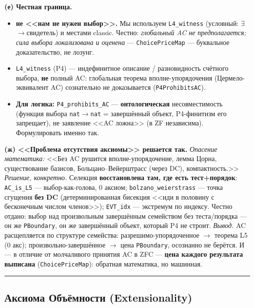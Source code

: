\documentclass[11pt,a4paper]{article}
\begin{document}
\textbf{(е) Честная граница.}
\begin{itemize}
\item \textbf{не <<нам не нужен выбор>>.} Мы используем \texttt{L4\_\allowbreak{}witness} (условный: $\exists$$\to$свидетель) и местами classic. Честно: \emph{глобальный AC не предполагается; сила выбора локализована и оценена} --- \texttt{Choice\allowbreak{}Price\allowbreak{}Map} --- буквальное доказательство, не лозунг.
\item \texttt{L4\_\allowbreak{}witness} (P4) --- индефинитное описание / разновидность счётного выбора, \textbf{не} полный AC: глобальная теорема вполне-упорядочения (Цермело-эквивалент AC) сознательно не доказывается (\texttt{P4Prohibits\allowbreak{}AC}).
\item \textbf{Для логика:} \texttt{P4\_\allowbreak{}prohibits\_\allowbreak{}AC} --- \textbf{онтологическая} несовместимость (функция выбора \texttt{nat$\to$nat} = завершённый объект, P4-финитизм его запрещает), не заявление <<AC ложна>> (в ZF независима). Формулировать именно так.
\end{itemize}

\textbf{(ж) <<Проблема отсутствия аксиомы>> решается так.} \emph{Опасение математика:} <<Без AC рушится вполне-упорядочение, лемма Цорна, существование базисов, Больцано--Вейерштрасс (через DC), компактность.>> \emph{Решение, конкретно.} Селекция \textbf{восстановлена там, где есть тест+порядок}: \texttt{AC\_\allowbreak{}is\_\allowbreak{}L5} --- выбор-как-голова, 0 аксиом; \texttt{bolzano\_\allowbreak{}weierstrass} --- точка сгущения \textbf{без DC} (детерминированная бисекция <<иди в половину с бесконечным числом членов>>); \texttt{EVT\_\allowbreak{}idx} --- экстремум по индексу. Честно отдано: выбор над произвольным завершённым семейством без теста/порядка --- он же \texttt{PBoundary}, он же завершённый объект, который P4 не строит. \emph{Вывод.} AC расщепляется по структуре семейства: разрешимо-упорядоченное $\to$ теорема L5 (0 акс); произвольно-завершённое $\to$ цена \texttt{PBoundary}, осознанно не берётся. И --- в отличие от молчаливого принятия AC в ZFC --- \textbf{цена каждого результата выписана} (\texttt{Choice\allowbreak{}Price\allowbreak{}Map}): обратная математика, но машинная.

\bigskip\hrule\bigskip

\subsection{Аксиома Объёмности (Extensionality)}
\end{document}
